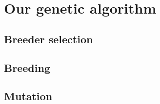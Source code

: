\section{Our genetic algorithm}\label{sec:algorithm}

\subsection{Breeder selection}\label{subsec:selection}

\subsection{Breeding}\label{subsec:breeding}

\subsection{Mutation}\label{subsec:mutation}
